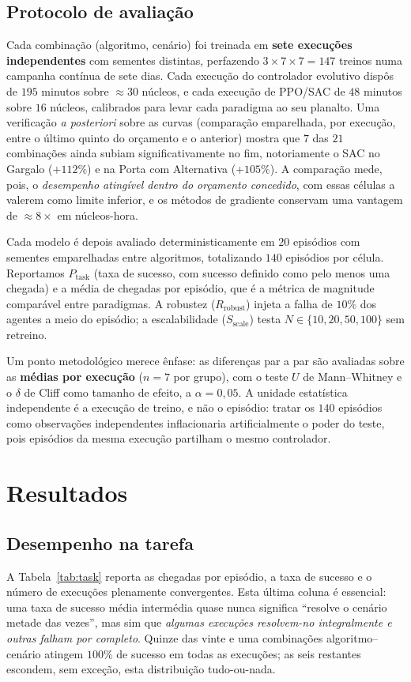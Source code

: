 \documentclass[final,5p,times,twocolumn,authoryear]{elsarticle}
\begin{document}
\subsection{Protocolo de avaliação}
 Cada combinação (algoritmo, cenário) foi treinada em \textbf{sete execuções
independentes} com sementes distintas, perfazendo $3\times7\times7=147$ treinos
numa campanha contínua de sete dias. Cada execução do controlador evolutivo
dispôs de $195$ minutos sobre $\approx 30$ núcleos, e cada execução de PPO/SAC de
$48$ minutos sobre $16$ núcleos, calibrados para levar cada paradigma ao seu
planalto. Uma verificação \emph{a posteriori} sobre as curvas (comparação
emparelhada, por execução, entre o último quinto do orçamento e o anterior)
mostra que $7$ das $21$ combinações ainda subiam significativamente no fim,
notoriamente o SAC no Gargalo ($+112\%$) e na Porta com Alternativa ($+105\%$).
A comparação mede, pois, o \emph{desempenho atingível dentro do orçamento
concedido}, com essas células a valerem como limite inferior, e os métodos de
gradiente conservam uma vantagem de $\approx 8\times$ em núcleos-hora.

Cada modelo é depois avaliado deterministicamente em $20$ episódios com sementes
emparelhadas entre algoritmos, totalizando $140$ episódios por célula. Reportamos
$P_{\text{task}}$ (taxa de sucesso, com sucesso definido como pelo menos uma
chegada) e a média de chegadas por episódio, que é a métrica de
magnitude comparável entre paradigmas. A robustez ($R_{\text{robust}}$) injeta a
falha de $10\%$ dos agentes a meio do episódio; a escalabilidade
($S_{\text{scale}}$) testa $N\in\{10,20,50,100\}$ sem retreino.

Um ponto metodológico merece ênfase: as diferenças par a par são avaliadas sobre
as \textbf{médias por execução} ($n=7$ por grupo), com o teste $U$ de
Mann--Whitney e o $\delta$ de Cliff como tamanho de efeito, a $\alpha=0{,}05$. A
unidade estatística independente é a execução de treino, e não o episódio:
tratar os $140$ episódios como observações independentes inflacionaria
artificialmente o poder do teste, pois episódios da mesma execução partilham o
mesmo controlador.

\section{Resultados}
\label{sec:results}

\subsection{Desempenho na tarefa}
A Tabela~\ref{tab:task} reporta as chegadas por episódio, a taxa de sucesso
e o número de execuções plenamente convergentes. Esta última coluna é essencial:
uma taxa de sucesso média intermédia quase nunca significa ``resolve o cenário
metade das vezes'', mas sim que \emph{algumas execuções resolvem-no integralmente
e outras falham por completo}. Quinze das vinte e uma combinações
algoritmo--cenário atingem $100\%$ de sucesso em todas as execuções; as seis
restantes escondem, sem exceção, esta distribuição tudo-ou-nada.
\end{document}

